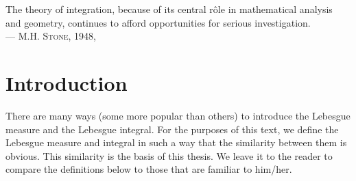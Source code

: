 \documentclass[main.tex]{subfiles}
\begin{document}
\thispagestyle{empty}
\begin{flushright}
\begin{minipage}{.7\columnwidth}
\begin{flushright}
The theory of integration,
because of its 
central r\^ole 
in mathematical analysis and geometry,
continues to afford opportunities 
for serious investigation.\\
--- \textsc{M.H. Stone}, 1948, \cite{Stone48}
\end{flushright}
\end{minipage}
\end{flushright}
\clearpage
\section{Introduction}
\noindent
There are many ways (some more popular than
others) to introduce the Lebesgue measure
and the Lebesgue integral.
For the purposes of this text,
we define the Lebesgue measure and integral
in such a way that the similarity between them is obvious.
This similarity is the basis of this thesis.
We leave it to the reader to 
compare the  definitions below
to those that are familiar to him/her.
\end{document}
